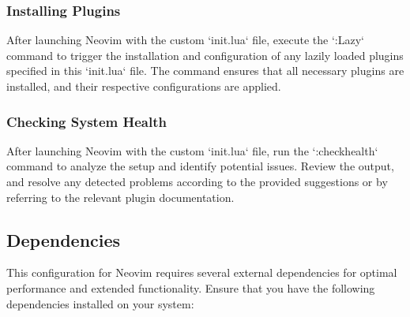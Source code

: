 \documentclass{article}
\begin{document}
\subsubsection{Installing Plugins}
After launching Neovim with the custom `init.lua` file, execute the `:Lazy` 
command to trigger the installation and configuration of any lazily loaded 
plugins specified in this `init.lua` file. The command ensures that all 
necessary plugins are installed, and their respective configurations are applied.

\subsubsection{Checking System Health}
After launching Neovim with the custom `init.lua` file, run the `:checkhealth` 
command to analyze the setup and identify potential issues. Review the output, 
and resolve any detected problems according to the provided suggestions or by 
referring to the relevant plugin documentation.

\subsection{Dependencies}\label{sec:dependencies}

This configuration for Neovim requires several external dependencies for 
optimal performance and extended functionality. Ensure that you have the 
following dependencies installed on your system:
\end{document}
